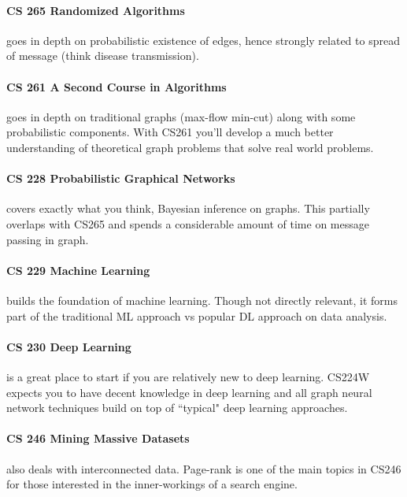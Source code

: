 \paragraph{CS 265 Randomized Algorithms} goes in depth on probabilistic existence of edges, hence strongly related to spread of message (think disease transmission).

\paragraph{CS 261 A Second Course in Algorithms} goes in depth on traditional graphs (max-flow min-cut) along with some probabilistic components. With CS261 you'll develop a much better understanding of theoretical graph problems that solve real world problems.

\paragraph{CS 228 Probabilistic Graphical Networks} covers exactly what you think, Bayesian inference on graphs. This partially overlaps with CS265 and spends a considerable amount of time on message passing in graph. 

\paragraph{CS 229 Machine Learning} builds the foundation of machine learning. Though not directly relevant, it forms part of the traditional ML approach vs popular DL approach on data analysis.

\paragraph{CS 230 Deep Learning} is a great place to start if you are relatively new to deep learning. CS224W expects you to have decent knowledge in deep learning and all graph neural network techniques build on top of ``typical" deep learning approaches.

\paragraph{CS 246 Mining Massive Datasets} also deals with interconnected data. Page-rank is one of the main topics in CS246 for those interested in the inner-workings of a search engine.
